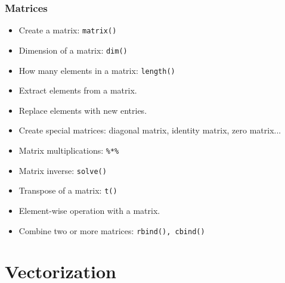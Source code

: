 \documentclass[10pt]{beamer}
\begin{document}
\begin{frame}
\frametitle{Matrices}
  \begin{itemize}
  \item Create a matrix: \texttt{matrix()}
  \item Dimension of a matrix: \texttt{dim()}
  \item How many elements in a matrix: \texttt{length()}
  \item Extract elements from a matrix.
  \item Replace elements with new entries.
  \item Create special matrices: diagonal matrix, identity matrix,
    zero matrix...
  \item Matrix multiplications: \texttt{\%*\%}
  \item Matrix inverse: \texttt{solve()}
  \item Transpose of a matrix: \texttt{t()}
  \item Element-wise operation with a matrix.
  \item Combine two or more matrices: \texttt{rbind(), cbind()}
  \end{itemize}
\end{frame}



\section{Vectorization}
\end{document}
